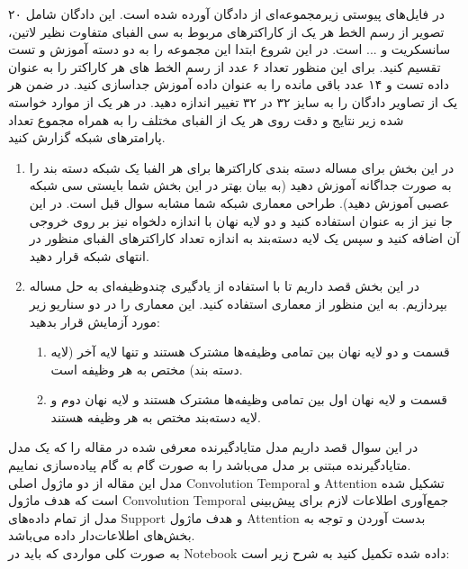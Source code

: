 \documentclass{article}
\begin{document}
در فایل‌های پیوستی زیرمجموعه‌ای از دادگان
آورده شده است. این دادگان شامل ۲۰ تصویر از رسم الخط‌ هر یک از کاراکتر‌های مربوط به سی الفبای متفاوت نظیر لاتین، سانسکریت و ... است.
در این شروع ابتدا این مجموعه را به دو دسته آموزش و تست تقسیم کنید.  برای این منظور تعداد ۶ عدد از رسم الخط های هر کاراکتر را به عنوان داده تست و ۱۴ عدد باقی مانده را به عنوان داده آموزش جداسازی کنید. در ضمن هر یک از تصاویر دادگان را به سایز ۳۲ در ۳۲ تغییر اندازه دهید.
در هر یک از موارد خواسته شده زیر نتایج و دقت روی هر یک از الفبای مختلف را به همراه مجموع تعداد پارامتر‌های شبکه گزارش کنید. 
\begin{enumerate}
\item
در این بخش برای مساله دسته بندی کاراکترها برای هر الفبا یک شبکه دسته بند را به صورت جداگانه آموزش دهید (به بیان بهتر در این بخش شما بایستی سی شبکه عصبی آموزش دهید).
طراحی معماری شبکه شما مشابه سوال قبل است. در این جا نیز از 
به عنوان
استفاده کنید و دو لایه نهان
با اندازه دلخواه نیز بر روی خروجی آن اضافه کنید و سپس یک لایه دسته‌بند به اندازه تعداد کاراکترهای الفبای منظور در انتهای شبکه قرار دهید.
\item
در این بخش قصد داریم تا با استفاده از یادگیری چندوظیفه‌ای به حل مساله بپردازیم.
به این منظور از معماری 
استفاده کنید. 
این معماری را در دو سناریو زیر مورد آزمایش قرار بدهید:
\begin{enumerate}
\item
قسمت
و دو لایه نهان بین تمامی وظیفه‌ها مشترک هستند و تنها لایه آخر (لایه دسته بند) مختص به هر وظیفه است.
\item
قسمت
و لایه نهان اول بین تمامی وظیفه‌ها مشترک هستند و لایه نهان دوم و لایه دسته‌بند مختص به هر وظیفه هستند.

\end{enumerate}

\end{enumerate}


در این سوال قصد داریم مدل متایادگیرنده معرفی شده در مقاله
\href{https://arxiv.org/abs/1707.03141}{}
را که یک مدل متایادگیرنده مبتنی بر مدل می‌باشد را به صورت گام به گام پیاده‌سازی نماییم.
\\
مدل این مقاله از دو ماژول اصلی Convolution Temporal و Attention تشکیل شده است که هدف ماژول Convolution Temporal جمع‌آوری اطلاعات لازم برای پیش‌بینی مدل از تمام داده‌های Support و هدف ماژول Attention بدست آوردن و توجه به بخش‌های اطلاعات‌دار داده می‌باشد.\\
به صورت کلی مواردی که باید در Notebook داده شده تکمیل کنید به شرح زیر است:
\end{document}
